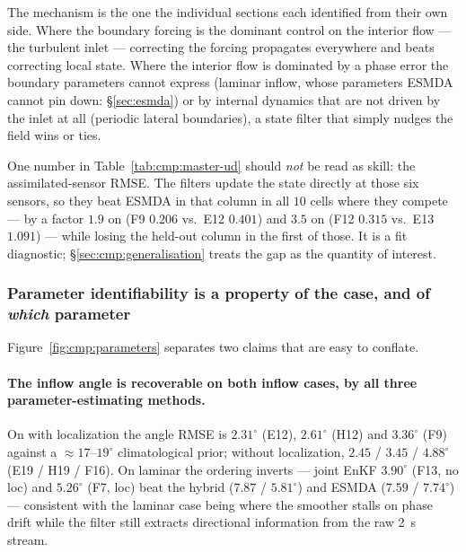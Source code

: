 The mechanism is the one the individual sections each identified from their
own side. Where the boundary forcing is the dominant control on the interior
flow --- the turbulent inlet --- correcting the forcing propagates everywhere
and beats correcting local state. Where the interior flow is dominated by a
phase error the boundary parameters cannot express (laminar inflow, whose
parameters ESMDA cannot pin down: \S\ref{sec:esmda}) or by internal dynamics
that are not driven by the inlet at all (periodic lateral boundaries), a state
filter that simply nudges the field wins or ties. 

One number in Table~\ref{tab:cmp:master-ud} should \emph{not} be read as skill:
the assimilated-sensor RMSE. The filters update the state directly at those six
sensors, so they beat ESMDA in that column in all $10$ cells where
they compete --- by a factor $1.9$ on  (F9 $0.206$ vs.\
E12 $0.401$) and $3.5$ on  (F12 $0.315$ vs.\ E13 $1.091$) ---
while losing
the held-out column in the first of those. It is a fit diagnostic;
\S\ref{sec:cmp:generalisation} treats the gap as the quantity of interest.

\subsubsection{Parameter identifiability is a property of the case, and of
\emph{which} parameter}
\label{sec:cmp:params}

Figure~\ref{fig:cmp:parameters} separates two claims that are easy to conflate.

\paragraph{The inflow angle is recoverable on both inflow cases, by all three
parameter-estimating methods.} On \code{inflow\_turb} with localization the
angle RMSE is $2.31^\circ$ (E12), $2.61^\circ$ (H12) and $3.36^\circ$ (F9)
against a $\approx 17$--$19^\circ$ climatological prior; without localization,
$2.45$ / $3.45$ / $4.88^\circ$ (E19 / H19 / F16). On laminar \code{inflow} the
ordering inverts --- joint EnKF $3.90^\circ$ (F13, no loc) and $5.26^\circ$
(F7, loc) beat the hybrid ($7.87$ / $5.81^\circ$) and ESMDA ($7.59$ /
$7.74^\circ$)
--- consistent with the laminar case being where the smoother stalls on phase
drift while the filter still extracts directional information from the raw
\SI{2}{\second} stream.

